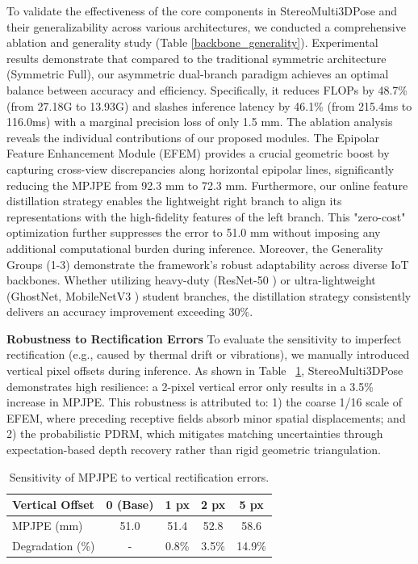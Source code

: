 \documentclass[journal]{IEEEtran}
\begin{document}
To validate the effectiveness of the core components in StereoMulti3DPose and their generalizability across various architectures, we conducted a comprehensive ablation and generality study (Table \ref{backbone_generality}). Experimental results demonstrate that compared to the traditional symmetric architecture (Symmetric Full), our asymmetric dual-branch paradigm achieves an optimal balance between accuracy and efficiency. Specifically, it reduces FLOPs by 48.7\% (from 27.18G to 13.93G) and slashes inference latency by 46.1\% (from 215.4ms to 116.0ms) with a marginal precision loss of only 1.5 mm.
The ablation analysis reveals the individual contributions of our proposed modules. The Epipolar Feature Enhancement Module (EFEM) provides a crucial geometric boost by capturing cross-view discrepancies along horizontal epipolar lines, significantly reducing the MPJPE from 92.3 mm to 72.3 mm. Furthermore, our online feature distillation strategy enables the lightweight right branch to align its representations with the high-fidelity features of the left branch. This "zero-cost" optimization further suppresses the error to 51.0 mm without imposing any additional computational burden during inference.
Moreover, the Generality Groups (1-3) demonstrate the framework’s robust adaptability across diverse IoT backbones. Whether utilizing heavy-duty (ResNet-50 ) or ultra-lightweight (GhostNet, MobileNetV3 ) student branches, the distillation strategy consistently delivers an accuracy improvement exceeding 30\%.


\textbf{Robustness to Rectification Errors}
To evaluate the sensitivity to imperfect rectification (e.g., caused by thermal drift or vibrations), we manually introduced vertical pixel offsets during inference. As shown in Table ~\ref{rectification_error}, StereoMulti3DPose demonstrates high resilience: a 2-pixel vertical error only results in a 3.5\% increase in MPJPE. This robustness is attributed to: 1) the coarse 1/16 scale of EFEM, where preceding receptive fields absorb minor spatial displacements; and 2) the probabilistic PDRM, which mitigates matching uncertainties through expectation-based depth recovery rather than rigid geometric triangulation.

\begin{table}[htbp]
\centering
\caption{Sensitivity of MPJPE to vertical rectification errors.}
\label{rectification_error}
\renewcommand{\arraystretch}{1.1}
\small
\begin{tabular}{l|cccc}
\hline
\textbf{Vertical Offset} & \textbf{0 (Base)} & \textbf{1 px} & \textbf{2 px} & \textbf{5 px} \\ \hline
MPJPE (mm)               & 51.0              & 51.4          & 52.8          & 58.6          \\
Degradation (\%)         & -                 & 0.8\%         & 3.5\%         & 14.9\%        \\ \hline
\end{tabular}
\end{table}
\end{document}
